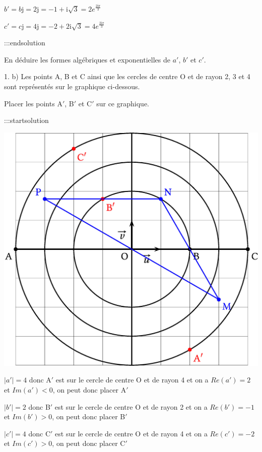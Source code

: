 \documentclass{cornouaille}
\begin{document}
$b'= b\text{j}=2\text{j}=-1+\text{i}\sqrt{3}=2e^{\frac{2\text{i}\pi}{3}}$

$c'= c\text{j}=4\text{j}=-2+2\text{i}\sqrt{3}=4e^{\frac{2\text{i}\pi}{3}}$


:::endsolution

En déduire les formes algébriques et exponentielles de $a'$, $b'$ et $c'$.


1. b)  Les points A, B et C ainsi que les cercles de centre O et de rayon 2, 3 et 4 sont
représentés sur le graphique ci-dessous.

Placer les points A$'$, B$'$ et C$'$ sur ce graphique.


:::startsolution




\includegraphics{./TS-Complexes-Loga-0}



$|a'|=4$ donc A$'$ est sur le cercle de centre O et de rayon 4 et on a $Re\left(a' \right) =2$ et $Im\left(a' \right)<0$, on peut donc placer A$'$


$|b'|=2$ donc B$'$ est sur le cercle de centre O et de rayon 2 et on a $Re\left(b' \right) =-1$ et $Im\left(b' \right)>0$, on peut donc placer B$'$


$|c'|=4$ donc C$'$ est sur le cercle de centre O et de rayon 4 et on a $Re\left(c' \right) =-2$ et $Im\left(c' \right)>0$, on peut donc placer C$'$
\end{document}

